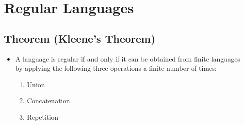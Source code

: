 \documentclass[12pt]{article}
\date{January 28, 2021}
\begin{document}
\maketitle

\section{Regular Languages}

\subsection{Theorem (Kleene's Theorem)}
\begin{itemize}
    \item A language is regular if and only if it can be obtained from finite languages by applying the following three operations a finite number of times:
    \begin{enumerate}
        \item Union
        \item Concatenation
        \item Repetition 
    \end{enumerate}
\end{itemize}
\end{document}

